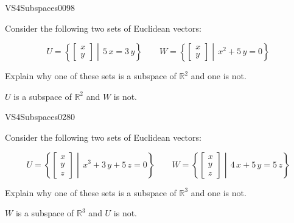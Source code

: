 \begin{exercise}{VS4}{Subspaces}{0098} 
\begin{exerciseStatement} 

Consider the following two sets of Euclidean vectors: 

 \[
          U=\left\{ \left[\begin{array}{c}
x \\
y
\end{array}\right] \middle|\,5 \, x = 3 \, y\right\} \hspace{2em}  W=\left\{ \left[\begin{array}{c}
x \\
y
\end{array}\right] \middle|\,x^{2} + 5 \, y = 0\right\}
    \] 

 Explain why one of these sets is a subspace of \(\mathbb{R}^2\) and one is not. 

 \end{exerciseStatement}
 \begin{exerciseAnswer} 

\(U\) is a subspace of \(\mathbb{R}^2\) and \(W\) is not.

 \end{exerciseAnswer}
 \end{exercise}


\newpage




\begin{exercise}{VS4}{Subspaces}{0280} 
\begin{exerciseStatement} 

Consider the following two sets of Euclidean vectors: 

 \[
          U=\left\{ \left[\begin{array}{c}
x \\
y \\
z
\end{array}\right] \middle|\,x^{3} + 3 \, y + 5 \, z = 0\right\} \hspace{2em}  W=\left\{ \left[\begin{array}{c}
x \\
y \\
z
\end{array}\right] \middle|\,4 \, x + 5 \, y = 5 \, z\right\}
    \] 

 Explain why one of these sets is a subspace of \(\mathbb{R}^3\) and one is not. 

 \end{exerciseStatement}
 \begin{exerciseAnswer} 

\(W\) is a subspace of \(\mathbb{R}^3\) and \(U\) is not.

 \end{exerciseAnswer}
 \end{exercise}



